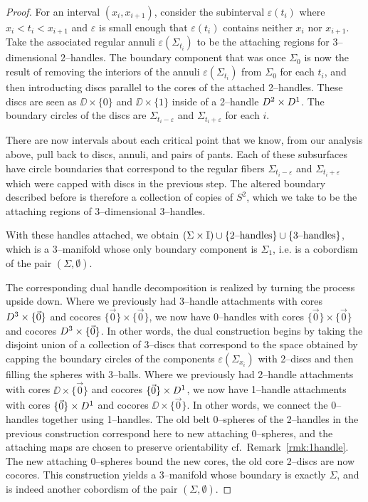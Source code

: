 \begin{proof}
	For an interval $(x_i,x_{i+1})$, consider the subinterval $\varepsilon(t_i)$ where $x_i<t_i<x_{i+1}$ and $\varepsilon$ is small enough that $\varepsilon(t_i)$ contains neither $x_i$ nor $x_{i+1}$.
	Take the associated regular annuli $\varepsilon(\Sigma_{t_i})$ to be the attaching regions for 3--dimensional 2--handles.
	The boundary component that was once $\Sigma_0$ is now the result of removing the interiors of the annuli $\varepsilon(\Sigma_{t_i})$ from $\Sigma_0$ for each $t_i$, and then introducting discs parallel to the cores of the attached 2--handles.
	These discs are seen as $\DD\times\{0\}$ and $\DD\times\{1\}$ inside of a 2--handle $D^2\times D^1$.
	The boundary circles of the discs are $\Sigma_{t_i-\varepsilon}$ and $\Sigma_{t_i+\varepsilon}$ for each $i$.
	
	There are now intervals about each critical point that we know, from our analysis above, pull back to discs, annuli, and pairs of pants.
	Each of these subsurfaces have circle boundaries that correspond to the regular fibers $\Sigma_{t_i-\varepsilon}$ and $\Sigma_{t_i+\varepsilon}$ which were capped with discs in the previous step.
	The altered boundary described before is therefore a collection of copies of $S^2$, which we take to be the attaching regions of 3--dimensional 3--handles.
	
	With these handles attached, we obtain $(\Sigma\times\mathbb{I})\cup\{\textrm{2--handles}\}\cup\{\textrm{3--handles}\}$, which is a 3--manifold whose only boundary component is $\Sigma_1$, i.e. is a cobordism of the pair $(\Sigma,\emptyset)$.
	
	The corresponding dual handle decomposition is realized by turning the process upside down.
	Where we previously had 3--handle attachments with cores $D^3\times\{\vec{0}\}$ and cocores $\{\vec{0}\}\times\{\vec{0}\}$, we now have 0--handles with cores $\{\vec{0}\}\times\{\vec{0}\}$ and cocores $D^3\times\{\vec{0}\}$.
	In other words, the dual construction begins by taking the disjoint union of a collection of 3--discs that correspond to the space obtained by capping the boundary circles of the components $\varepsilon(\Sigma_{x_i})$ with 2--discs and then filling the spheres with 3--balls.
	Where we previously had 2--handle attachments with cores $\DD\times\{\vec{0}\}$ and cocores $\{\vec{0}\}\times D^1$, we now have 1--handle attachments with cores $\{\vec{0}\}\times D^1$ and cocores $\DD\times\{\vec{0}\}$.
	In other words, we connect the 0--handles together using 1--handles.
	The old belt 0--spheres of the 2--handles in the previous construction correspond here to new attaching 0--spheres, and the attaching maps are chosen to preserve orientability cf.\ Remark~\ref{rmk:1handle}.
	The new attaching 0--spheres bound the new cores, the old core 2--discs are now cocores.
	This construction yields a 3--manifold whose boundary is exactly $\Sigma$, and is indeed another cobordism of the pair $(\Sigma,\emptyset)$.
	

\end{proof}
